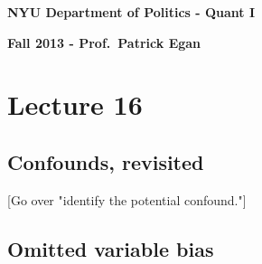 \documentclass[11pt]{article}
\begin{document}
\singlespacing

\textbf{NYU Department of Politics - Quant I}

\textbf{Fall 2013 - Prof.\ Patrick Egan}

\doublespacing

\section{Lecture 16}

\subsection{Confounds, revisited}

[Go over "identify the potential confound."]

\subsection{Omitted variable bias}
\end{document}
